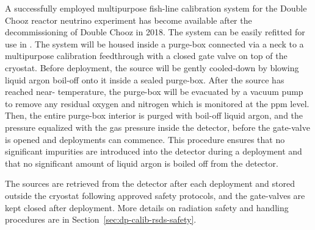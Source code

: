 A successfully employed multipurpose fish-line calibration
system
for the Double Chooz reactor neutrino experiment has become available 
after the decommissioning of Double Chooz in 2018. The system can be
easily refitted for use in . The system will be housed inside
a purge-box connected via a neck to a multipurpose
calibration feedthrough 
with a closed gate valve on top of the
cryostat. Before deployment, the source will be gently cooled-down by blowing liquid argon boil-off onto it inside a sealed purge-box. After the source has reached 
near- temperature, the purge-box will be evacuated by a vacuum pump to remove any residual oxygen and nitrogen which is monitored at the ppm level. Then, the entire purge-box interior is purged with boil-off liquid argon, and the pressure equalized with the gas pressure inside the detector, before the gate-valve is opened and deployments can commence. This procedure ensures that no significant impurities are introduced into the detector during a deployment and that no significant amount of liquid argon is boiled off from the detector. 

The sources are retrieved from the
detector after each deployment and stored outside the cryostat following approved safety protocols, and the gate-valves are kept closed after deployment. More details on radiation safety and handling procedures are in Section~\ref{sec:dp-calib-rsds-safety}.

